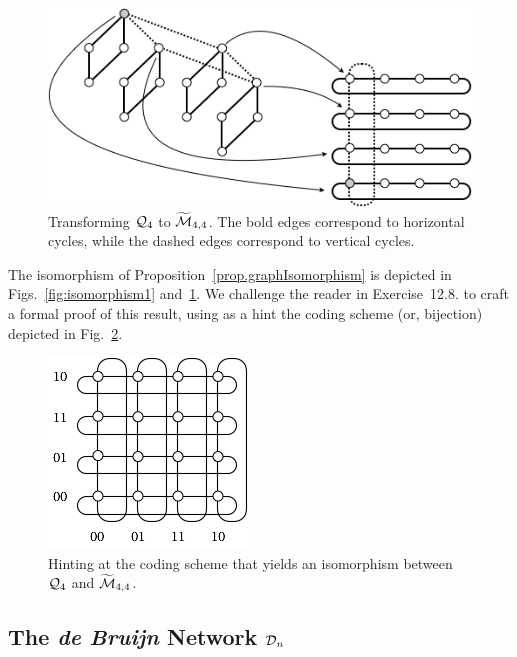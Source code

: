 \begin{figure}[hbt]
\begin{center}
       \includegraphics[scale=0.5]{FiguresGraph/Isomorphism2}
       \caption{Transforming $\mbox{$\cal Q$}_4$ to $\widetilde{\mbox{$\cal M$}}_{4,4}$.  The bold edges correspond to horizontal cycles, while the dashed edges correspond to vertical cycles.}
  \label{fig:isomorphism2}
\end{center}
\end{figure}

The isomorphism of Proposition~\ref{prop.graphIsomorphism} is depicted in Figs.~\ref{fig:isomorphism1} and~\ref{fig:isomorphism2}.  We challenge the reader in Exercise~12.8. to craft a formal proof of this result, using as a hint the coding scheme (or, bijection) depicted in Fig.~\ref{fig:toruslabel}.
\begin{figure}[hbt]
\begin{center}
       \includegraphics[scale=0.6]{FiguresGraph/toruslabel}
\caption{Hinting at the coding scheme that yields an isomorphism between $\mbox{$\cal Q$}_4$ and $\widetilde{\mbox{$\cal M$}}_{4,4}$.}
  \label{fig:toruslabel}
\end{center}
\end{figure}


\subsection{The {\it de Bruijn} Network $\mbox{$\cal D$}_n$}
\label{sec:deBruijn}

